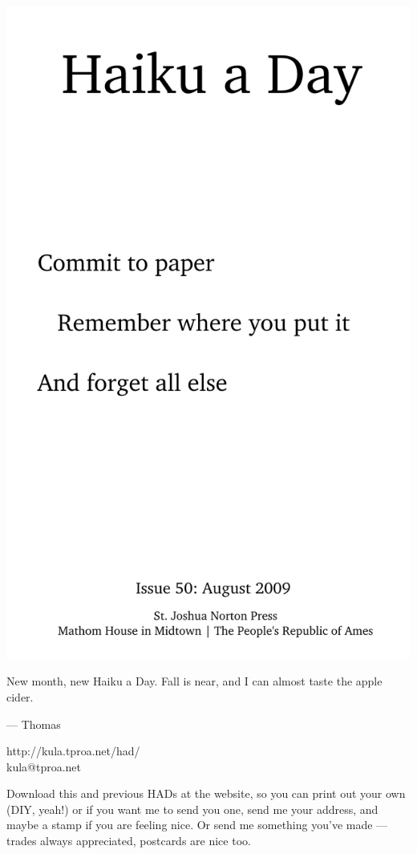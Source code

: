 \documentclass[12pt]{article}
\begin{document}
\includegraphics{frontpage.png}

\newpage

New month, new Haiku a Day. Fall is near, and I can almost taste
the apple cider.

--- Thomas

http://kula.tproa.net/had/ \\
kula@tproa.net

Download this and previous HADs at the website, so you can
print out your own (DIY, yeah!) or if you want me to send
you one, send me your address, and maybe a stamp if you
are feeling nice. Or send me something you've made ---
trades always appreciated, postcards are nice too.
\end{document}
